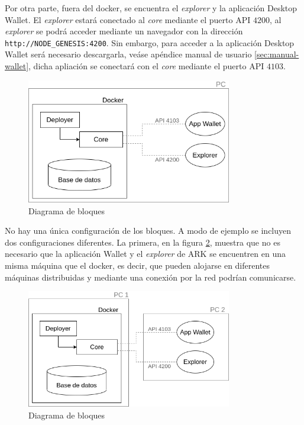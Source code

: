 Por otra parte, fuera del docker, se encuentra el \textit{explorer} y la aplicación Desktop Wallet. El \textit{explorer} estará conectado al \textit{core} mediante el puerto API $4200$, al \textit{explorer} se podrá acceder mediante un navegador con la dirección \mbox{\texttt{http://NODE\_GENESIS:4200}}. Sin embargo, para acceder a la aplicación Desktop Wallet será necesario descargarla, veáse apéndice manual de usuario \ref{sec:manual-wallet}, dicha apliación se conectará con el \textit{core} mediante el puerto API $4103$.\\


\begin{figure}[H]
	\centering
	\includegraphics[width=0.8\textwidth]{figuras/diagrama_bloquesARK.png}
	\caption{Diagrama de bloques}
	\label{fig:diag-bloques-1}
\end{figure}

No hay una única configuración de los bloques. A modo de ejemplo se incluyen dos configuraciones diferentes. La primera, en la figura \ref{fig:diag-bloques-2}, muestra que no es necesario que la aplicación Wallet y el \textit{explorer} de ARK se encuentren en una misma máquina que el docker, es decir, que pueden alojarse en diferentes máquinas distribuidas y mediante una conexión por la red podrían comunicarse.\\ 

\begin{figure}[H]
	\centering
	\includegraphics[width=0.8\textwidth]{figuras/diagrama_bloquesARK2.png}
	\caption{Diagrama de bloques}
	\label{fig:diag-bloques-2}
\end{figure}

